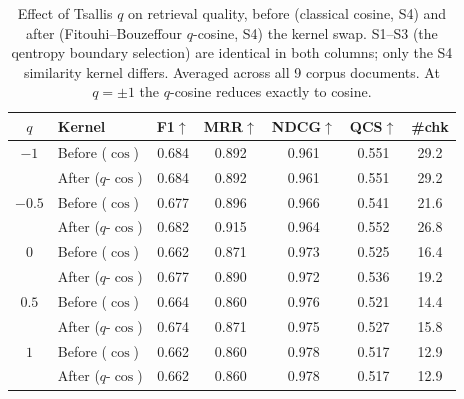 \begin{table}[t]\centering
\caption{Effect of Tsallis $q$ on retrieval quality, before (classical cosine, S4) and after (Fitouhi--Bouzeffour $q$-cosine, S4) the kernel swap. S1--S3 (the qentropy boundary selection) are identical in both columns; only the S4 similarity kernel differs. Averaged across all 9 corpus documents. At $q=\pm1$ the $q$-cosine reduces exactly to cosine.}
\label{tab:qcos_by_q}
\begin{tabular}{@{}c l ccccc@{}}\toprule
$q$ & Kernel & F1$\uparrow$ & MRR$\uparrow$ & NDCG$\uparrow$ & QCS$\uparrow$ & \#chk \\\midrule
$-1$ & Before ($\cos$) & 0.684 & 0.892 & 0.961 & 0.551 & 29.2 \\
 & After ($q\text{-}\cos$) & 0.684 & 0.892 & 0.961 & 0.551 & 29.2 \\
\addlinespace[1pt]
$-0.5$ & Before ($\cos$) & 0.677 & 0.896 & 0.966 & 0.541 & 21.6 \\
 & After ($q\text{-}\cos$) & 0.682 & 0.915 & 0.964 & 0.552 & 26.8 \\
\addlinespace[1pt]
$0$ & Before ($\cos$) & 0.662 & 0.871 & 0.973 & 0.525 & 16.4 \\
 & After ($q\text{-}\cos$) & 0.677 & 0.890 & 0.972 & 0.536 & 19.2 \\
\addlinespace[1pt]
$0.5$ & Before ($\cos$) & 0.664 & 0.860 & 0.976 & 0.521 & 14.4 \\
 & After ($q\text{-}\cos$) & 0.674 & 0.871 & 0.975 & 0.527 & 15.8 \\
\addlinespace[1pt]
$1$ & Before ($\cos$) & 0.662 & 0.860 & 0.978 & 0.517 & 12.9 \\
 & After ($q\text{-}\cos$) & 0.662 & 0.860 & 0.978 & 0.517 & 12.9 \\
\bottomrule\end{tabular}\end{table}


